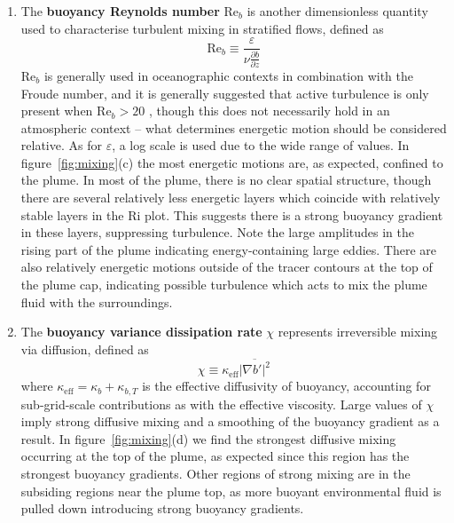 \documentclass[a4paper]{article}
\begin{document}
\begin{enumerate}[label=(\alph*)]
	\item The \textbf{buoyancy Reynolds number} $\mathrm{Re}_b$ is another dimensionless quantity used to
		characterise turbulent mixing in stratified flows, defined as
		\begin{equation}
			\mathrm{Re}_b \equiv \frac{\varepsilon}{\nu \frac{\partial b}{\partial z}}
		\end{equation}
		$\mathrm{Re}_b$ is generally used in oceanographic contexts in combination with the Froude number, and
		it is generally suggested that active turbulence is only present when $\mathrm{Re}_b > 20$
		\citep{garcia2011}, though this does not necessarily hold in an atmospheric context -- what determines
		energetic motion should be considered relative. As for $\varepsilon$, a log scale is used due to the
		wide range of values. In figure~\ref{fig:mixing}(c) the most energetic motions are, as expected, confined
		to the plume. In most of the plume, there is no clear spatial structure, though there are several
		relatively less energetic layers which coincide with relatively stable layers in the $\mathrm{Ri}$
		plot. This suggests there is a strong buoyancy gradient in these layers, suppressing turbulence. Note
		the large amplitudes in the rising part of the plume indicating energy-containing large eddies. There
		are also relatively energetic motions outside of the tracer contours at the top of the plume cap,
		indicating possible turbulence which acts to mix the plume fluid with the surroundings.

	\item The \textbf{buoyancy variance dissipation rate} $\chi$ represents irreversible mixing via diffusion,
		defined as
		\begin{equation}
			\chi \equiv \kappa_{\text{eff}} \overline{\left| \nabla b' \right|^2}
		\end{equation}
		where $\kappa_{\text{eff}} = \kappa_b + \kappa_{b,T}$ is the effective diffusivity of buoyancy,
		accounting for sub-grid-scale contributions as with the effective viscosity. Large values of $\chi$
		imply strong diffusive mixing and a smoothing of the buoyancy gradient as a result. In
		figure~\ref{fig:mixing}(d) we find the strongest diffusive mixing occurring at the top of the plume, as
		expected since this region has the strongest buoyancy gradients. Other regions of strong mixing are in
		the subsiding regions near the plume top, as more buoyant environmental fluid is pulled down
		introducing strong buoyancy gradients.


\end{enumerate}
\end{document}
